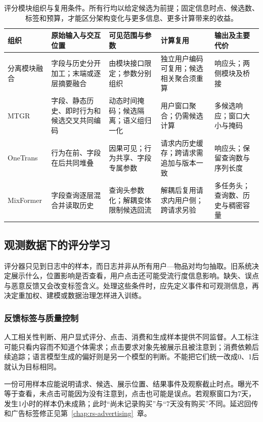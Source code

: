 \begin{table}[htbp]
 \centering\small
 \begin{tabularx}{\linewidth}{@{}lXXXX@{}}
 \toprule
 组织 & 原始输入与交互位置 & 可见范围与参数 & 计算复用 & 输出及主要代价\\
 \midrule
 分离模块融合 & 字段与历史分开加工；末端或逐层摘要融合 & 由模块接口限定；参数分别组织 & 独立用户编码可复用；候选相关聚合须重算 & 响应头；两侧模块及桥接\\
 MTGR & 字段、静态历史、即时行为和候选交叉共同编码 & 动态时间掩码；候选隔离；语义组归一化 & 用户窗口聚合；仍需候选计算 & 多候选响应；窗口大小与掩码\\
 OneTrans & 行为在前、字段在后共同堆叠 & 因果可见；行为共享、字段专属参数 & 请求内历史缓存；跨请求需追加与版本一致 & 响应头；保留查询数与序列长度\\
 MixFormer & 字段查询逐层混合并读取历史 & 查询头参数化；解耦变体限制候选回流 & 解耦后复用请求内用户侧；跨请求另验 & 多任务头；查询数、历史与稠密容量\\
 \bottomrule
 \end{tabularx}
 \caption{评分模块组织与复用条件。所有行均以给定候选为前提；固定信息时点、候选数、标签和预算，才能区分架构变化与更多信息、更多计算带来的收益。}
 \label{tab:rs-scoring-reuse}
\end{table}

\subsection{观测数据下的评分学习}
\label{sec:rs-observed-learning}

评分器只见到日志中的样本，而日志并非从所有用户—物品对均匀抽取。旧系统决定展示什么，位置影响是否查看，用户点击还可能受流行度信息影响。缺失、误点与恶意反馈又会改变标签含义。处理这些条件时，应先定义事件和可观测信息，再决定重加权、建模或数据治理怎样进入训练。

\subsubsection{反馈标签与质量控制}
\label{sec:rs-feedback-quality}

人工相关性判断、用户显式评分、点击、消费和生成样本提供不同监督。人工标注可能只看内容而不知道个体需求；点击要求对象先被展示且被注意到；消费依赖后续追踪；语言模型生成的偏好则是另一个模型的判断。不能把它们统一改成0、1后就认为目标相同。

一份可用样本应能说明请求、候选、展示位置、结果事件及观察截止时点。曝光不等于查看，未点击可能因为没有注意到，点击也可能是误点。若观察窗口为7天，发生1小时的样本仍未成熟；此时“尚未记录购买”与“7天没有购买”不同。延迟回传和广告标签修正见第~\ref{chap:rs-advertising}~章。

